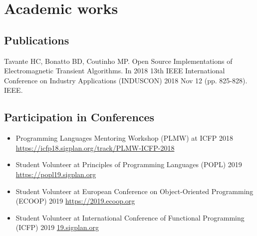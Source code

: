 \chapter*{ Academic works }
\label{academic}

\section*{Publications}

Tavante HC, Bonatto BD, Coutinho MP. Open Source Implementations of Electromagnetic Transient Algorithms. In 2018 13th IEEE International Conference on Industry Applications (INDUSCON) 2018 Nov 12 (pp. 825-828). IEEE.

\section*{Participation in Conferences}

\begin{itemize}
  \item Programming Languages Mentoring Workshop (PLMW) at ICFP 2018 \url{https://icfp18.sigplan.org/track/PLMW-ICFP-2018}
  \item Student Volunteer at Principles of Programming Languages (POPL) 2019 \url{https://popl19.sigplan.org}
  \item Student Volunteer at European Conference on Object-Oriented Programming (ECOOP) 2019 \url{https://2019.ecoop.org}
  \item Student Volunteer at International Conference of Functional Programming (ICFP) 2019 \url{19.sigplan.org}
\end{itemize}
